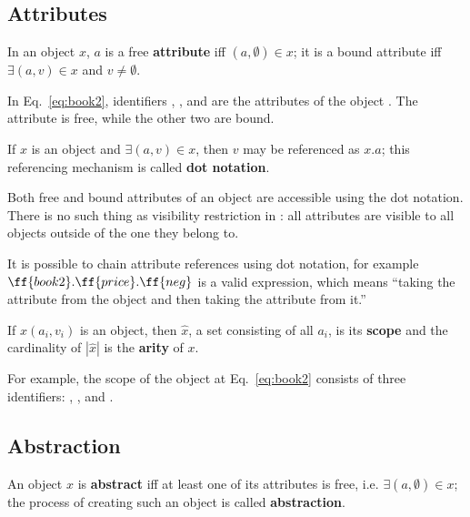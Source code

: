 \subsection{Attributes}

\begin{eodefinition}\label{def:attribute}
In an object $x$, $a$ is a free \textbf{attribute}
iff $(a, \emptyset) \in x$; it is a bound attribute
iff $\exists (a, v)\in x$ and $v\not=\emptyset$.
\end{eodefinition}

In Eq.~\ref{eq:book2}, identifiers , , and 
are the attributes of the object .
The attribute  is free, while the other two are bound.

\begin{eodefinition}\label{def:dot}
If $x$ is an object and $\exists (a, v) \in x$, then $v$ may be referenced as $x.a$;
this referencing mechanism is called \textbf{dot notation}.
\end{eodefinition}

Both free and bound attributes of an object are accessible using
the dot notation. There is no such thing as
visibility restriction in \phic{}:
all attributes are visible to all objects outside of the one they belong to.

It is possible to chain attribute references using dot notation, for example
$\ff{book2}.\ff{price}.\ff{neg}$ is a valid expression, which means
``taking the attribute  from the object  and then
taking the attribute  from it.''

\begin{eodefinition}\label{def:scope}
If $x(a_i, v_i)$ is an object, then $\hat{x}$, a set consisting of all $a_i$,
is its \textbf{scope} and the cardinality of $|\hat{x}|$ is
the \textbf{arity} of $x$.
\end{eodefinition}

For example, the scope of the object at Eq.~\ref{eq:book2} consists of three identifiers:
, , and .

\subsection{Abstraction}

\begin{eodefinition}\label{def:abstraction}
An object $x$ is \textbf{abstract} iff at least one of its attributes is free,
i.e. $\exists (a, \emptyset)\in x$;
the process of creating such an object is called \textbf{abstraction}.
\end{eodefinition}

